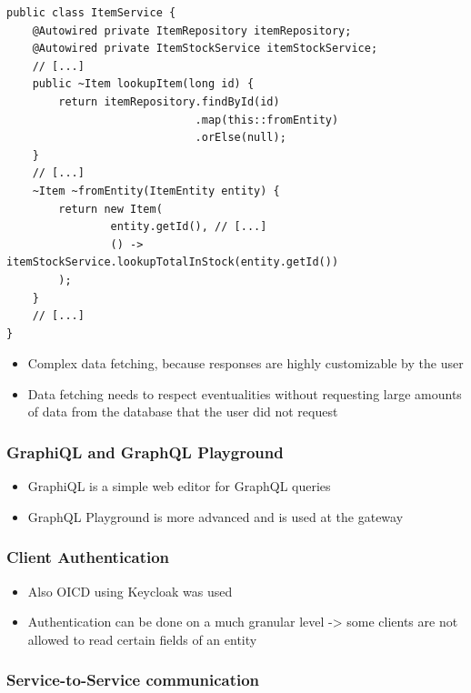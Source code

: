 \begin{lstlisting}[caption={\acs{API} Model Creation with Fetcher Injection}, style=java-ext]
public class ItemService {
    @Autowired private ItemRepository itemRepository;
    @Autowired private ItemStockService itemStockService;
    // [...]
    public ~Item lookupItem(long id) {
        return itemRepository.findById(id)
                             .map(this::fromEntity)
                             .orElse(null);
    }
    // [...]
    ~Item ~fromEntity(ItemEntity entity) {
        return new Item(
                entity.getId(), // [...]
                () -> itemStockService.lookupTotalInStock(entity.getId())
        );
    }
    // [...]
}
\end{lstlisting}

\begin{itemize}
    \item Complex data fetching, because responses are highly customizable by the user
    \item Data fetching needs to respect eventualities without requesting large amounts of data from the database that the user did not request
\end{itemize}

\subsubsection{GraphiQL and GraphQL Playground}

\begin{itemize}
    \item GraphiQL is a simple web editor for GraphQL queries
    \item GraphQL Playground is more advanced and is used at the gateway
\end{itemize}

\subsubsection{Client Authentication}

\begin{itemize}
    \item Also OICD using Keycloak was used
    \item Authentication can be done on a much granular level -> some clients are not allowed to read certain fields of an entity
\end{itemize}

\subsubsection{Service-to-Service communication}

